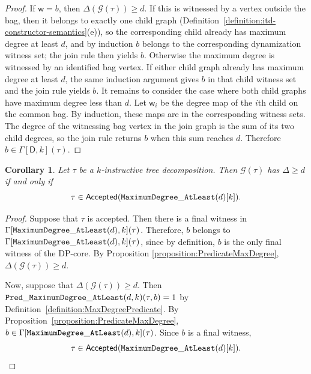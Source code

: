 \documentclass[11pt,a4paper]{article}
\newtheorem{corollary}[theorem]{Corollary}
\newcommand{\truevalue}{1}
\newcommand{\treewidthvalue}{k}
\newcommand{\decompositiongraph}[1]{\mathcal{G}(#1)}
\newcommand{\maxDegree}{\Delta}
\newcommand{\accepteddecompositions}[1]{\mathsf{Accepted}(#1)}
\newcommand{\abstractdecomposition}{\tau}
\newcommand{\awitness}{\mathsf{w}}
\newcommand{\dpcore}{\mathsf{D}}
\newcommand{\dpNamePart}[1]{\mbox{\normalfont\ttfamily #1}}
\newcommand{\maxDegreeAtLeastCore}[1]{\dpNamePart{MaximumDegree}\_\allowbreak\dpNamePart{AtLeast}(#1)}
\newcommand{\predicateMaxDegree}[2]{\dpNamePart{Pred}\_\allowbreak\dpNamePart{MaximumDegree}\_\allowbreak\dpNamePart{AtLeast}(#1,#2)}
\newcommand{\dynamizationfunctionname}[1]{\Gamma[{#1}]}
\newcommand{\dynamizationfunction}[2]{\dynamizationfunctionname{#1,#2}}
\newcommand{\maxdegreeparameter}{d}
\newcommand{\maxdegreefound}{b}
\newcommand{\mxdp}{\predicateMaxDegree{\maxdegreeparameter}{\treewidthvalue}}
\begin{document}
{\begin{proof}
If $\awitness=\maxdegreefound$, then $\maxDegree(\decompositiongraph{\abstractdecomposition})\ge \maxdegreeparameter$. If this is witnessed by a vertex outside the bag, then it belongs to exactly one child graph (Definition~\ref{definition:itd-constructor-semantics}(e)), so the corresponding child already has maximum degree at least $\maxdegreeparameter$, and by induction $\maxdegreefound$ belongs to the corresponding dynamization witness set; the join rule then yields $\maxdegreefound$. Otherwise the maximum degree is witnessed by an identified bag vertex. If either child graph already has maximum degree at least $\maxdegreeparameter$, the same induction argument gives $\maxdegreefound$ in that child witness set and the join rule yields $\maxdegreefound$. It remains to consider the case where both child graphs have maximum degree less than $\maxdegreeparameter$. Let $\awitness_i$ be the degree map of the $i$th child on the common bag. By induction, these maps are in the corresponding witness sets. The degree of the witnessing bag vertex in the join graph is the sum of its two child degrees, so the join rule returns $\maxdegreefound$ when this sum reaches $\maxdegreeparameter$. Therefore $\maxdegreefound\in \dynamizationfunction{\dpcore}{\treewidthvalue}(\abstractdecomposition)$.
\end{proof}

\begin{corollary}
\label{corollary:CorrectnessMaxDegree}
Let $\abstractdecomposition$ be a $\treewidthvalue$-instructive tree decomposition. Then $\decompositiongraph{\abstractdecomposition}$
has $\maxDegree\geq \maxdegreeparameter$ if and only if
\[
\abstractdecomposition \in
\accepteddecompositions{\maxDegreeAtLeastCore{\maxdegreeparameter}[\treewidthvalue]}.
\]
\end{corollary}
\begin{proof}
Suppose that $\abstractdecomposition$ is accepted. Then there is a final witness in
$\dynamizationfunction{\maxDegreeAtLeastCore{\maxdegreeparameter}}{\treewidthvalue}(\abstractdecomposition)$. Therefore, $\maxdegreefound$ belongs to
$\dynamizationfunction{\maxDegreeAtLeastCore{\maxdegreeparameter}}{\treewidthvalue}(\abstractdecomposition)$,
since by definition, $\maxdegreefound$ is the only final witness of the DP-core. By Proposition \ref{proposition:PredicateMaxDegree}, $\maxDegree(\decompositiongraph{\abstractdecomposition})\geq \maxdegreeparameter$.

Now, suppose that $\maxDegree(\decompositiongraph{\abstractdecomposition})\geq \maxdegreeparameter$. Then $\mxdp(\abstractdecomposition,\maxdegreefound)=\truevalue$ by Definition~\ref{definition:MaxDegreePredicate}. By Proposition~\ref{proposition:PredicateMaxDegree}, $\maxdegreefound\in
\dynamizationfunction{\maxDegreeAtLeastCore{\maxdegreeparameter}}{\treewidthvalue}(\abstractdecomposition)$. Since $\maxdegreefound$ is a final witness,
\[
\abstractdecomposition   \in
\accepteddecompositions{\maxDegreeAtLeastCore{\maxdegreeparameter}[\treewidthvalue]}.
\]
\end{proof}


}
\end{document}
